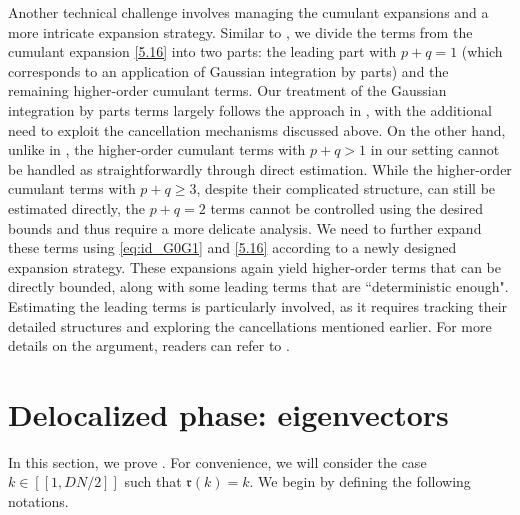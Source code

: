 \documentclass[10pt,reqno]{amsart}
\numberwithin{equation}{section}
\numberwithin{figure}{section}
\theoremstyle{plain} %
\theoremstyle{definition} %
\newcommand{\fr}{{\mathfrak{r}}}
\newcommand{\qq}[1]{[\![{#1}]\!]}
\newcommand{\pa}[1]{\left({#1}\right)}
\newcommand{\avga}[1]{\left\langle #1 \right\rangle}
\numberwithin{equation}{section}
\begin{document}
Another technical challenge involves managing the cumulant expansions and a more intricate expansion strategy. Similar to \cite{stone2024randommatrixmodelquantum}, we divide the terms from the cumulant expansion \eqref{5.16} into two parts: the leading part with $p+q=1$ (which corresponds to an application of Gaussian integration by parts) and the remaining higher-order cumulant terms. 
Our treatment of the Gaussian integration by parts terms largely follows the approach in \cite{stone2024randommatrixmodelquantum}, with the additional need to exploit the cancellation mechanisms discussed above. 
On the other hand, unlike in \cite{stone2024randommatrixmodelquantum}, the higher-order cumulant terms with $p+q>1$ in our setting cannot be handled as straightforwardly through direct estimation. 
While the higher-order cumulant terms with $p+q\ge 3$, despite their complicated structure, can still be estimated directly, the $p+q=2$ terms cannot be controlled using the desired bounds and thus require a more delicate analysis. 
We need to further expand these terms using \eqref{eq:id_G0G1} and \eqref{5.16} according to a newly designed expansion strategy. 
These expansions again yield higher-order terms that can be directly bounded, along with some leading terms that are ``deterministic enough". Estimating the leading terms is particularly involved, as it requires tracking their detailed structures and exploring the cancellations mentioned earlier. For more details on the argument, readers can refer to . 






\section{Delocalized phase: eigenvectors}\label{sec:delocalized_case_eigenvector}

In this section, we prove . For convenience, we will consider the case $k\in\qq{1,DN/2}$ such that $\fr\pa{k}=k$. We begin by defining the following notations.
\end{document}
